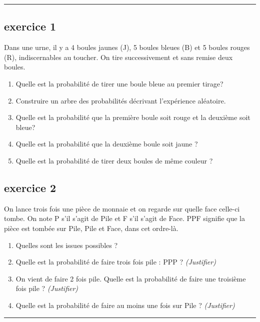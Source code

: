 \documentclass[11pt]{article}
\newcommand{\horrule}[1]{\rule{\linewidth}{#1}} %
\begin{document}
\vspace{-0.4cm}
\horrule{1px}
\vspace{-0.8cm}

\begin{multicols}{2}
  \subsection*{exercice 1}
  Dans une urne, il y a 4 boules jaunes (J), 5 boules bleues (B) et 5 boules rouges (R), indiscernables au toucher. On tire successivement et sans remise deux boules.
  \begin{enumerate}
  \item Quelle est la probabilité de tirer une boule bleue au premier tirage?
  \item Construire un arbre des probabilités décrivant l'expérience aléatoire.
  \item Quelle est la probabilité que la première boule soit rouge et la deuxième soit bleue?
  \item Quelle est la probabilité que la deuxième boule soit jaune ?
  \item Quelle est la probabilité de tirer deux boules de même couleur ?
  \end{enumerate}

  \subsection*{exercice 2}

  On lance trois fois une pièce de monnaie et on regarde sur quelle face celle-ci tombe. On note P s’il s’agit de Pile et F s’il s’agit de Face. 
  PPF signifie que la pièce est tombée sur Pile, Pile et Face, dans cet ordre-là.

  \begin{enumerate}
  \item Quelles sont les issues possibles ?
  \item Quelle est la probabilité de faire trois fois pile : PPP ?  \textit{(Justifier)}
  \item On vient de faire 2 fois pile. Quelle est la probabilité de faire une troisième fois pile ? \textit{(Justifier)}
  \item Quelle est la probabilité de faire au moins une fois sur Pile ? \textit{(Justifier)}
  \end{enumerate}
\end{multicols}

\vspace{-0.4cm}
\horrule{1px}
\vspace{-0.8cm}
\end{document}
